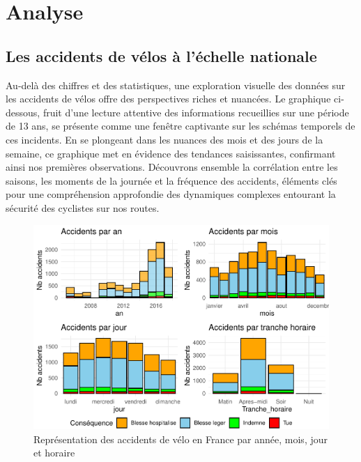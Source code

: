 \documentclass[french,]{compterendu}
\theoremstyle{urcastyle}
\theoremstyle{remark}
\begin{document}
\hypertarget{analyse}{%
\section{Analyse}\label{analyse}}

\hypertarget{les-accidents-de-vuxe9los-uxe0-luxe9chelle-nationale}{%
\subsection{Les accidents de vélos à l'échelle nationale}\label{les-accidents-de-vuxe9los-uxe0-luxe9chelle-nationale}}

Au-delà des chiffres et des statistiques, une exploration visuelle des données sur les accidents de vélos offre des perspectives riches et nuancées. Le graphique ci-dessous, fruit d'une lecture attentive des informations recueillies sur une période de 13 ans, se présente comme une fenêtre captivante sur les schémas temporels de ces incidents. En se plongeant dans les nuances des mois et des jours de la semaine, ce graphique met en évidence des tendances saisissantes, confirmant ainsi nos premières observations. Découvrons ensemble la corrélation entre les saisons, les moments de la journée et la fréquence des accidents, éléments clés pour une compréhension approfondie des dynamiques complexes entourant la sécurité des cyclistes sur nos routes.

\begin{figure}[H]

{\centering \includegraphics[width=0.9\linewidth]{Rapport_ADD_LEO-GABET_files/figure-latex/accfrancedetail-1} 

}

\caption{Représentation des accidents de vélo en France par année, mois, jour et horaire}\label{fig:accfrancedetail}
\end{figure}
\end{document}

